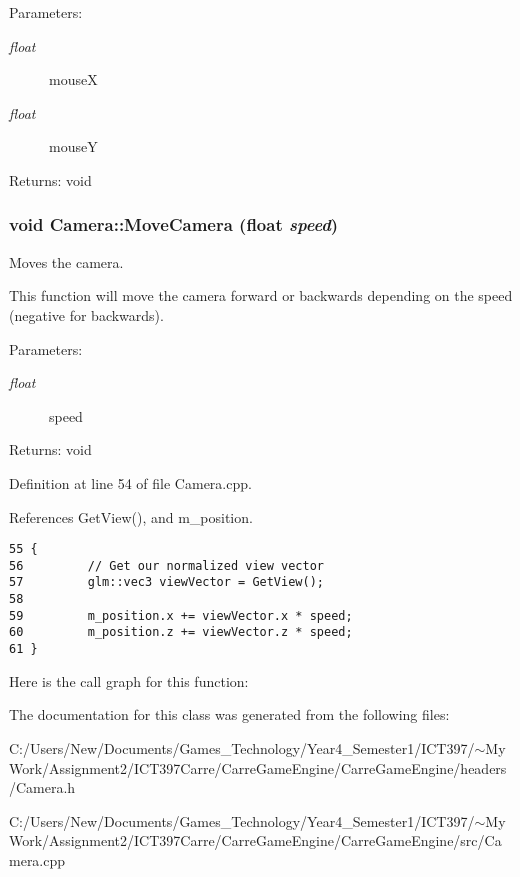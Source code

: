 \begin{Desc}
\item[Parameters:]
\begin{description}
\item[{\em float}]mouseX \item[{\em float}]mouseY \end{description}
\end{Desc}
\begin{Desc}
\item[Returns:]void \end{Desc}
\hypertarget{class_camera_ec3a27aa4de4ad2d10d421ee2fa54223}{
\subsubsection[MoveCamera]{\setlength{\rightskip}{0pt plus 5cm}void Camera::MoveCamera (float {\em speed})}}
\label{class_camera_ec3a27aa4de4ad2d10d421ee2fa54223}


Moves the camera. 

This function will move the camera forward or backwards depending on the speed (negative for backwards).

\begin{Desc}
\item[Parameters:]
\begin{description}
\item[{\em float}]speed \end{description}
\end{Desc}
\begin{Desc}
\item[Returns:]void \end{Desc}


Definition at line 54 of file Camera.cpp.

References GetView(), and m\_\-position.

\begin{Code}\begin{verbatim}55 {
56         // Get our normalized view vector
57         glm::vec3 viewVector = GetView();
58 
59         m_position.x += viewVector.x * speed;
60         m_position.z += viewVector.z * speed;
61 }
\end{verbatim}
\end{Code}




Here is the call graph for this function:

The documentation for this class was generated from the following files:\begin{CompactItemize}
\item 
C:/Users/New/Documents/Games\_\-Technology/Year4\_\-Semester1/ICT397/$\sim$My Work/Assignment2/ICT397Carre/CarreGameEngine/CarreGameEngine/headers/Camera.h\item 
C:/Users/New/Documents/Games\_\-Technology/Year4\_\-Semester1/ICT397/$\sim$My Work/Assignment2/ICT397Carre/CarreGameEngine/CarreGameEngine/src/Camera.cpp\end{CompactItemize}
